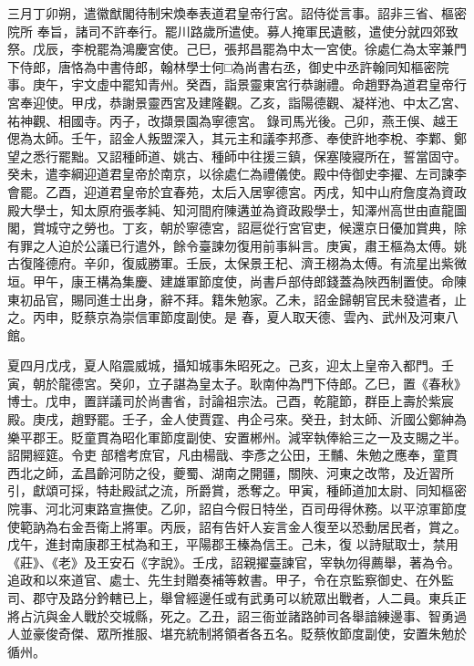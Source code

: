 \begin{pinyinscope}
 三月丁卯朔，遣徽猷閣待制宋煥奉表道君皇帝行宮。詔侍從言事。詔非三省、樞密院所
 奉旨，諸司不許奉行。罷川路歲所遣使。募人掩軍民遺骸，遣使分就四郊致祭。戊辰，李梲罷為鴻慶宮使。己巳，張邦昌罷為中太一宮使。徐處仁為太宰兼門下侍郎，唐恪為中書侍郎，翰林學士何□為尚書右丞，御史中丞許翰同知樞密院事。庚午，宇文虛中罷知青州。癸酉，詣景靈東宮行恭謝禮。命趙野為道君皇帝行宮奉迎使。甲戌，恭謝景靈西宮及建隆觀。乙亥，詣陽德觀、凝祥池、中太乙宮、祐神觀、相國寺。丙子，改擷景園為寧德宮。
 錄司馬光後。己卯，燕王俁、越王偲為太師。壬午，詔金人叛盟深入，其元主和議李邦彥、奉使許地李梲、李鄴、鄭望之悉行罷黜。又詔種師道、姚古、種師中往援三鎮，保塞陵寢所在，誓當固守。癸未，遣李綱迎道君皇帝於南京，以徐處仁為禮儀使。殿中侍御史李擢、左司諫李會罷。乙酉，迎道君皇帝於宜春苑，太后入居寧德宮。丙戌，知中山府詹度為資政殿大學士，知太原府張孝純、知河間府陳遘並為資政殿學士，知澤州高世由直龍圖
 閣，賞城守之勞也。丁亥，朝於寧德宮，詔扈從行宮官吏，候還京日優加賞典，除有罪之人迫於公議已行遣外，餘令臺諫勿復用前事糾言。庚寅，肅王樞為太傅。姚古復隆德府。辛卯，復威勝軍。壬辰，太保景王杞、濟王栩為太傅。有流星出紫微垣。甲午，康王構為集慶、建雄軍節度使，尚書戶部侍郎錢蓋為陜西制置使。命陳東初品官，賜同進士出身，辭不拜。籍朱勉家。乙未，詔金歸朝官民未發遣者，止之。丙申，貶蔡京為崇信軍節度副使。是
 春，夏人取天德、雲內、武州及河東八館。



 夏四月戊戌，夏人陷震威城，攝知城事朱昭死之。己亥，迎太上皇帝入都門。壬寅，朝於龍德宮。癸卯，立子諶為皇太子。耿南仲為門下侍郎。乙巳，置《春秋》博士。戊申，置詳議司於尚書省，討論祖宗法。己酉，乾龍節，群臣上壽於紫宸殿。庚戌，趙野罷。壬子，金人使賈霆、冉企弓來。癸丑，封太師、沂國公鄭紳為樂平郡王。貶童貫為昭化軍節度副使、安置郴州。減宰執俸給三之一及支賜之半。詔開經筵。令吏
 部稽考庶官，凡由楊戩、李彥之公田，王黼、朱勉之應奉，童貫西北之師，孟昌齡河防之役，夔蜀、湖南之開疆，關陜、河東之改幣，及近習所引，獻頌可採，特赴殿試之流，所爵賞，悉奪之。甲寅，種師道加太尉、同知樞密院事、河北河東路宣撫使。乙卯，詔自今假日特坐，百司毋得休務。以平涼軍節度使範訥為右金吾衛上將軍。丙辰，詔有告奸人妄言金人復至以恐動居民者，賞之。戊午，進封南康郡王栻為和王，平陽郡王榛為信王。己未，復
 以詩賦取士，禁用《莊》、《老》及王安石《字說》。壬戌，詔親擢臺諫官，宰執勿得薦舉，著為令。追政和以來道官、處士、先生封贈奏補等敕書。甲子，令在京監察御史、在外監司、郡守及路分鈐轄已上，舉曾經邊任或有武勇可以統眾出戰者，人二員。東兵正將占沆與金人戰於交城縣，死之。乙丑，詔三衙並諸路帥司各舉諳練邊事、智勇過人並豪俊奇傑、眾所推服、堪充統制將領者各五名。貶蔡攸節度副使，安置朱勉於循州。




\end{pinyinscope}
